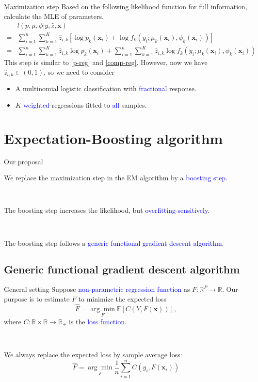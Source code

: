 \documentclass[professionalfont]{beamer}
\def\R{{\mathbb R}}  %
\def\E{{\mathbb E}}  %
\def\bx{\boldsymbol{x}}
\newcommand{\blue}[1]{\textcolor{blue}{#1}}
\begin{document}
\begin{frame}{Maximization step}
Based on the following likelihood function for full information, calculate the MLE of parameters.
	\begin{equation}
		\begin{aligned}
			&l(p,\mu,\phi|y,\hat{z},\bx)\\
			=&\sum_{i=1}^n\sum_{k=1}^K \hat{z}_{i,k}\left[\log p_k(\bx_i) + \log f_k(y_i;\mu_k(\bx_i),\phi_k(\bx_i))\right]\\
			=&\sum_{i=1}^n\sum_{k=1}^K \hat{z}_{i,k}\log p_k(\bx_i) + \sum_{i=1}^n\sum_{k=1}^K \hat{z}_{i,k}\log f_k(y_i;\mu_k(\bx_i),\phi_k(\bx_i))
		\end{aligned}
	\end{equation}
This step is similar to \eqref{p-reg} and \eqref{comp-reg}. However, now we have $\hat{z}_{i,k}\in(0,1)$, so we need to consider 
\begin{itemize}
	\item A multinomial logistic classification with \blue{fractional} response.
	\item $K$ \blue{weighted}-regressions fitted to \blue{all} samples. 
\end{itemize}
\end{frame}

\section{Expectation-Boosting algorithm}

\begin{frame}{Our proposal}
	
	We replace the maximization step in the EM algorithm by a \blue{boosting step}.
	
	~
	
	The boosting step  increases the likelihood, but \blue{overfitting-sensitively}.
	
	
	~
	
	The boosting step follows a \blue{generic functional gradient descent algorithm}.
	
\end{frame}

\subsection{Generic functional gradient descent algorithm}
\begin{frame}{General setting}
	Suppose \blue{non-parametric regression function} as $F:\R^P\rightarrow\R$. Our purpose is to  estimate $F$ to minimize the expected loss $$\hat{F}=\underset{F}{\arg\min}\E\left[C(Y,F(\bx))\right],$$
	where $C:\R\times\R\rightarrow\R_+$ is the \blue{loss function}.
	
	~
	
	We always replace the expected loss by sample average loss:
	$$\hat{F}=\underset{F}{\arg\min} \frac{1}{n}\sum_{i=1}^nC(y_i,F(\bx_i))$$
\end{frame}
\end{document}
